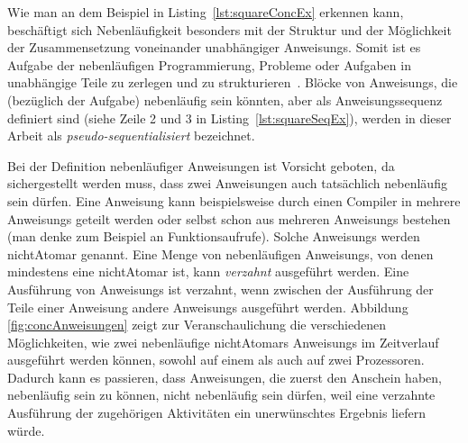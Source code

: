 Wie man an dem Beispiel in Listing~\ref{lst:squareConcEx} erkennen kann, beschäftigt sich Nebenläufigkeit besonders mit der Struktur und der Möglichkeit der Zusammensetzung voneinander unabhängiger \glspl{Anweisung}. Somit ist es Aufgabe der nebenläufigen Programmierung, Probleme oder Aufgaben in unabhängige Teile zu zerlegen und zu strukturieren~\cite{Pike2012,Hettel2016}. Blöcke von \glspl{Anweisung}, die (bezüglich der Aufgabe) nebenläufig sein könnten, aber als Anweisungssequenz definiert sind (siehe Zeile 2 und 3 in Listing~\ref{lst:squareSeqEx}), werden in dieser Arbeit als \emph{pseudo-sequentialisiert} bezeichnet.

Bei der Definition nebenläufiger Anweisungen ist Vorsicht geboten, da sichergestellt werden muss, dass zwei Anweisungen auch tatsächlich nebenläufig sein dürfen. Eine \gls{Anweisung} kann beispielsweise durch einen Compiler in mehrere \glspl{Anweisung} geteilt werden oder selbst schon aus mehreren \glspl{Anweisung} bestehen (man denke zum Beispiel an Funktionsaufrufe). Solche \glspl{Anweisung} werden \gls{nichtAtomar} genannt. Eine Menge von nebenläufigen \glspl{Anweisung}, von denen mindestens eine \gls{nichtAtomar} ist, kann \emph{verzahnt} ausgeführt werden. Eine Ausführung von \glspl{Anweisung} ist verzahnt, wenn zwischen der Ausführung der Teile einer  \gls{Anweisung} andere \glspl{Anweisung} ausgeführt werden. Abbildung \ref{fig:concAnweisungen} zeigt zur Veranschaulichung die verschiedenen Möglichkeiten, wie zwei nebenläufige \glspl{nichtAtomar} \glspl{Anweisung} im Zeitverlauf ausgeführt werden können, sowohl auf einem als auch auf zwei Prozessoren. Dadurch kann es passieren, dass Anweisungen, die zuerst den Anschein haben, nebenläufig sein zu können, nicht nebenläufig sein dürfen, weil eine verzahnte Ausführung der zugehörigen Aktivitäten ein unerwünschtes Ergebnis liefern würde. 

